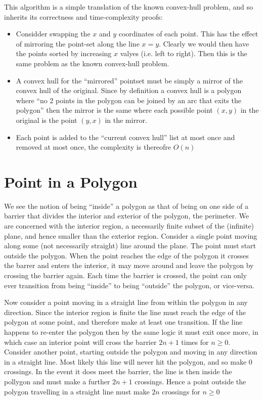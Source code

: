 This algorithm is a simple translation of the known convex-hull problem, and so inherits its correctness and time-complexity proofs:
\begin{itemize}
	\item Considder swapping the $x$ and $y$ coordinates of each point.  This has the effect of mirroring the point-set along the line $x = y$.  Clearly we would then have the points sorted by increasing $x$ valyes (i.e. left to right).  Then this is the same problem as the known convex-hull problem.
	\item A convex hull for the ``mirrored'' pointset must be simply a mirror of the convex hull of the original.  Since by definition a convex hull is a polygon where ``no 2 points in the polygon can be joined by an arc that exits the polygon'' then the mirror is the same where each possible point $(x,y)$ in the original is the point $(y,x)$ in the mirror.
	\item Each point is added to the ``current convex hull'' list at most once and removed at most once, the complexity is thereofre $O(n)$
\end{itemize}

\section {Point in a Polygon}

We see the notion of being ``inside'' a polygon as that of being on one side of a barrier that divides the interior and exterior of the polygon, the perimeter.
We are concerned with the interior region, a necessarily finite subset of the (infinite) plane, and hence smaller than the exterior region.
Consider a single point moving along some (not necessarily straight) line around the plane.  The point must start outside the polygon.
When the point reaches the edge of the polygon it crosses the barrer and enters the interior, it may move around and leave the polygon by crossing the barrier again.
Each time the barrier is crossed, the point can only ever transition from being ``inside'' to being ``outside'' the polygon, or vice-versa.

Now consider a point moving in a straight line from within the polygon in any direction.
Since the interior region is finite the line must reach the edge of the polygon at some point, and therefore make at least one transition.  If the line happens to re-enter the polygon then by the same logic it must exit once more, in which case an interior point will cross the barrier $2n+1$ times for $n \geq 0$.
Consider another point, starting outside the polygon and moving in any direction in a straight line.
Most likely this line will never hit the polygon, and so make 0 crossings.
In the event it does meet the barrier, the line is then inside the pollygon and must make a further $2n+1$ crossings.
Hence a point outside the polygon travelling in a straight line must make $2n$ crossings for $n \geq 0$

